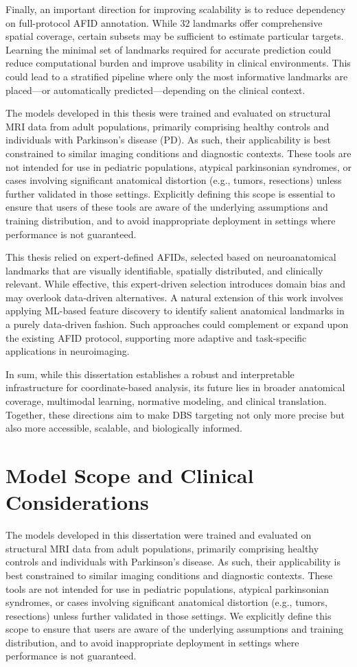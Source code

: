 Finally, an important direction for improving scalability is to reduce dependency on full-protocol AFID annotation. While 32 landmarks offer comprehensive spatial coverage, certain subsets may be sufficient to estimate particular targets. Learning the minimal set of landmarks required for accurate prediction could reduce computational burden and improve usability in clinical environments. This could lead to a stratified pipeline where only the most informative landmarks are placed—or automatically predicted—depending on the clinical context.

The models developed in this thesis were trained and evaluated on structural MRI data from adult populations, primarily comprising healthy controls and individuals with Parkinson’s disease (PD). As such, their applicability is best constrained to similar imaging conditions and diagnostic contexts. These tools are not intended for use in pediatric populations, atypical parkinsonian syndromes, or cases involving significant anatomical distortion (e.g., tumors, resections) unless further validated in those settings. Explicitly defining this scope is essential to ensure that users of these tools are aware of the underlying assumptions and training distribution, and to avoid inappropriate deployment in settings where performance is not guaranteed.

This thesis relied on expert-defined AFIDs, selected based on neuroanatomical landmarks that are visually identifiable, spatially distributed, and clinically relevant. While effective, this expert-driven selection introduces domain bias and may overlook data-driven alternatives. A natural extension of this work involves applying ML-based feature discovery to identify salient anatomical landmarks in a purely data-driven fashion. Such approaches could complement or expand upon the existing AFID protocol, supporting more adaptive and task-specific applications in neuroimaging.

In sum, while this dissertation establishes a robust and interpretable infrastructure for coordinate-based analysis, its future lies in broader anatomical coverage, multimodal learning, normative modeling, and clinical translation. Together, these directions aim to make DBS targeting not only more precise but also more accessible, scalable, and biologically informed.

\section{Model Scope and Clinical Considerations}
The models developed in this dissertation were trained and evaluated on structural MRI data from adult populations, primarily comprising healthy controls and individuals with Parkinson’s disease. As such, their applicability is best constrained to similar imaging conditions and diagnostic contexts. These tools are not intended for use in pediatric populations, atypical parkinsonian syndromes, or cases involving significant anatomical distortion (e.g., tumors, resections) unless further validated in those settings. We explicitly define this scope to ensure that users are aware of the underlying assumptions and training distribution, and to avoid inappropriate deployment in settings where performance is not guaranteed.

